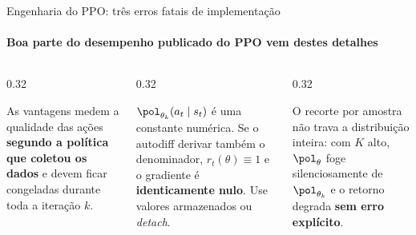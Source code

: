 \documentclass[aspectratio=169, 11pt]{beamer}
\newcommand{\Ahat}{\hat{A}}
\begin{document}
\begin{frame}{Engenharia do PPO: três erros fatais de implementação}
  \framesubtitle{Boa parte do desempenho publicado do PPO vem destes detalhes}

  \begin{columns}[T]
    \begin{column}{0.32\textwidth}
      \begin{alertabox}[title={1 · Recalcular $\Ahat_t$ dentro do laço de $K$ épocas}]
        As vantagens medem a qualidade das ações \textbf{segundo a política que coletou os dados}
        e devem ficar congeladas durante toda a iteração $k$.
      \end{alertabox}
    \end{column}
    \begin{column}{0.32\textwidth}
      \begin{alertabox}[title={2 · Não destacar o denominador de $r_t(\theta)$}]
        $\pol_{\theta_k}(a_t\mid s_t)$ é uma constante numérica. Se o autodiff derivar também o
        denominador, $r_t(\theta)\equiv 1$ e o gradiente é \textbf{identicamente nulo}.
        Use valores armazenados ou \emph{detach}.
      \end{alertabox}
    \end{column}
    \begin{column}{0.32\textwidth}
      \begin{alertabox}[title={3 · Usar épocas $K$ em excesso}]
        O recorte por amostra não trava a distribuição inteira: com $K$ alto, $\pol_\theta$ foge
        silenciosamente de $\pol_{\theta_k}$ e o retorno degrada \textbf{sem erro explícito}.
      \end{alertabox}
    \end{column}
  \end{columns}
\end{frame}
\end{document}
